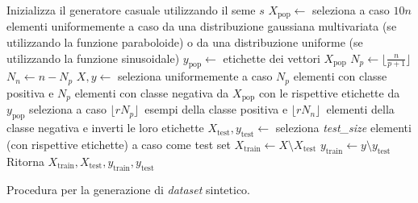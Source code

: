 \begin{algorithm}
    \SetAlgoLined
    Inizializza il generatore casuale utilizzando il seme $s$\;
    $X_{\text{pop}} \gets$ seleziona a caso $10n$ elementi uniformemente a caso da una distribuzione gaussiana multivariata (se utilizzando la funzione paraboloide) o da una distribuzione uniforme (se utilizzando la funzione sinusoidale)\;
    $y_{\text{pop}} \gets$ etichette dei vettori $X_{\text{pop}}$\;
    $N_p \gets \lfloor\frac{n}{p + 1}\rfloor$\;
    $N_n \gets n - N_p$\;
    $X, y \gets$ seleziona uniformemente a caso $N_p$ elementi con classe positiva e $N_p$ elementi con classe negativa da $X_{\text{pop}}$ con le rispettive etichette da $y_{\text{pop}}$\;   
    seleziona a caso $\lfloor rN_p \rfloor$\ esempi della classe positiva e $\lfloor r  N_n \rfloor$\ elementi della classe negativa e inverti le loro etichette\;
    $X_{\text{test}}, y_{\text{test}} \gets$ seleziona \emph{test\_size} elementi (con rispettive etichette) a caso come test set\;
    $X_{\text{train}} \gets X \setminus X_{\text{test}}$\;
    $y_{\text{train}} \gets y \setminus y_{\text{test}}$\;
    Ritorna $X_{\text{train}}, X_{\text{test}}, y_{\text{train}}, y_{\text{test}}$\;
\caption{Procedura per la generazione di \emph{dataset} sintetico.}
\label{alg:generazione_dataset_sintetici}
\end{algorithm}

